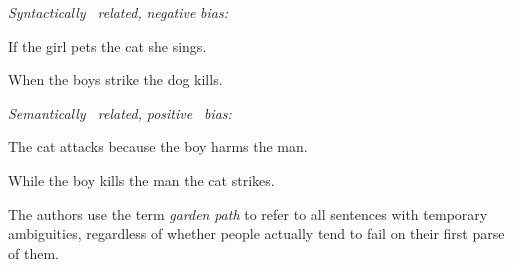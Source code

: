 \setcounter{listWWNumxxvileveli}{16}
\begin{listWWNumxxvileveli}
\item 
\begin{styleStandard}
\textit{Syntactically }\textit{\ }\textit{related,}\textit{ }\textit{negative}\textit{ }\textit{bias:}
\end{styleStandard}


\setcounter{listWWNumxxvilevelii}{0}
\begin{listWWNumxxvilevelii}
\item 
\begin{styleStandard}
If the girl pets the cat she sings.
\end{styleStandard}


\item 
\begin{styleStandard}
When the boys strike the dog kills.
\end{styleStandard}


\end{listWWNumxxvilevelii}
\end{listWWNumxxvileveli}
\setcounter{listWWNumxxvleveli}{17}
\begin{listWWNumxxvleveli}
\item 
\begin{styleStandard}
\textit{Semantically \ related,}\textit{ }\textit{positive }\textit{\ }\textit{bias:}
\end{styleStandard}


\setcounter{listWWNumxxvlevelii}{0}
\begin{listWWNumxxvlevelii}
\item 
\begin{styleStandard}
The cat attacks because the boy harms the man.
\end{styleStandard}


\item 
\begin{styleStandard}
While the boy kills the man the cat strikes.
\end{styleStandard}


\end{listWWNumxxvlevelii}
\end{listWWNumxxvleveli}
\setcounter{listWWNumxxxiileveli}{5}
\begin{listWWNumxxxiileveli}
\item 
\begin{styleStandard}
The authors use the term \textit{garden}\textit{ }\textit{path}\textit{ }to refer to all sentences with temporary ambiguities, regardless of whether people actually tend to fail on their first parse of them.
\end{styleStandard}


\end{listWWNumxxxiileveli}
